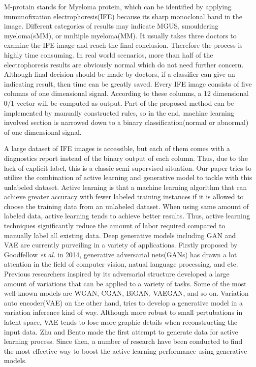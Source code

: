 \documentclass[letterpaper]{article}
\begin{document}
M-protain stands for Myeloma protein, which can be identified by applying immunofixation electrophoresis(IFE) because its sharp monoclonal band in the image. Different categories of results may indicate MGUS, smouldering myeloma(sMM), or multiple myeloma(MM). It usually takes three doctors to examine the IFE image and reach the final conclusion. Therefore the process is highly time consuming. In real world scenarios, more than half of the electrophoresis results are obviously normal which do not need further concern. Although final decision should be made by doctors, if a classifier can give an indicating result, then time can be greatly saved. Every IFE image consists of five columns of one dimensional signal. According to these columns, a 12 dimensional 0/1 vector will be computed as output. Part of the proposed method can be implemented by manually constructed rules, so in the end, machine learning involved section is narrowed down to a binary classification(normal or abnormal) of one dimensional signal.%

A large dataset of IFE images is accessible, but each of them comes with a diagnostics report instead of the binary output of each column. Thus, due to the lack of explicit label, this is a classic semi-supervised situation. Our paper tries to utilize the combination of active learning and generative model to tackle with this unlabeled dataset. Active learning is that a machine learning algorithm that can achieve greater accuracy with fewer labeled training instances if it is allowed to choose the training data from an unlabeled dataset\cite{settles2009active}. When using same amount of labeled data, active learning tends to achieve better results. Thus, active learning techniques significantly reduce the amount of labor required compared to manually label all existing data. Deep generative models including GAN and VAE are currently purveiling in a variety of applications. Firstly proposed by Goodfellow \emph{et al.} in 2014, generative adversarial nets(GANs) has drawn a lot attention in the field of computer vision, natual language processing, and etc. Previous researchers inspired by its adversarial structure developed a large amount of variations that can be applied to a variety of tasks. Some of the most well-known models are WGAN\cite{arjovsky2017wasserstein}, CGAN\cite{mirza2014conditional}, BiGAN\cite{donahue2016adversarial}, VAEGAN\cite{larsen2015autoencoding}, and so on. Variation auto encoder(VAE) on the other hand, tries to develop a generative model in a variation inference kind of way\cite{kingma2013auto}. Although more robust to small pertubations in latent space, VAE tends to lose more graphic details when reconstructing the input data. Zhu and Bento made the first attempt\cite{Zhu2017GenerativeAA} to generate data for active learning process. Since then, a number of research have been conducted to find the most effective way to boost the active learning performance using generative models.%
\end{document}
